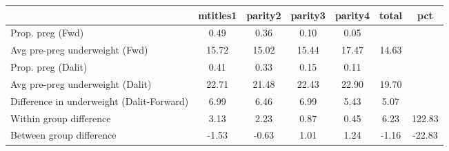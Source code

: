 \begin{tabular}{l*{6}{c}}
\toprule
            &\multicolumn{1}{c}{mtitles1}&\multicolumn{1}{c}{parity2}&\multicolumn{1}{c}{parity3}&\multicolumn{1}{c}{parity4}&\multicolumn{1}{c}{total}&\multicolumn{1}{c}{pct}\\
\midrule
\midrule
Prop. preg (Fwd)&        0.49&        0.36&        0.10&        0.05&            &            \\
Avg pre-preg underweight (Fwd)&       15.72&       15.02&       15.44&       17.47&       14.63&            \\
Prop. preg (Dalit)&        0.41&        0.33&        0.15&        0.11&            &            \\
Avg pre-preg underweight (Dalit)&       22.71&       21.48&       22.43&       22.90&       19.70&            \\
Difference in underweight (Dalit-Forward)&        6.99&        6.46&        6.99&        5.43&        5.07&            \\
Within group difference&        3.13&        2.23&        0.87&        0.45&        6.23&      122.83\\
Between group difference&       -1.53&       -0.63&        1.01&        1.24&       -1.16&      -22.83\\
\bottomrule
\end{tabular}
